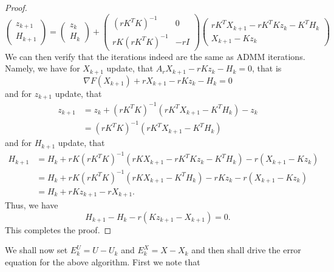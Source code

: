 \begin{itemize}
\begin{proof}
\begin{equation}
    \begin{pmatrix}
    z_{k+1}\\
    H_{k+1}
    \end{pmatrix} = \begin{pmatrix}
    z_{k}\\H_{k}
    \end{pmatrix} + \begin{pmatrix}
    (r K^T K)^{-1} & 0 \\
   r K (r K^T K)^{-1} & -r I
    \end{pmatrix} \begin{pmatrix}
     r K^T X_{k+1} - r K^T K z_k - K^T H_k\\
     X_{k+1} - Kz_k
    \end{pmatrix}
\end{equation}
We can then verify that the iterations indeed are the same as ADMM iterations. Namely, we have for $X_{k+1}$ update, that $A_r X_{k+1} - r Kz_{k} - H_k = 0 $, that is 
\begin{equation}
\nabla F(X_{k+1}) + r X_{k+1} - r K z_k - H_k = 0
\end{equation}
and for $z_{k+1}$ update, that \begin{equation}
\begin{aligned}
z_{k+1} &= z_k + (r K^T K)^{-1} (r K^T X_{k+1} - K^T H_k) - z_k \\
& = (r K^T K)^{-1} (r K^T X_{k+1} - K^T H_k)
\end{aligned}
\end{equation}
and for $H_{k+1}$ update, that  \begin{equation}
\begin{aligned}
H_{k+1} & = H_k +  r K(r K^T K )^{-1}\left( r K X_{k+1} - r K^T K z_k - K^T H_k \right) -r (X_{k+1} - Kz_k) \\
                & = H_k + r K(r K^T K )^{-1} (r K X_{k+1} - K^T H_k) - r K z_k - r (X_{k+1} - Kz_k) \\
                & = H_k +r K z_{k+1} -r X_{k+1}.
\end{aligned}
\end{equation}
Thus, we have 
\begin{equation}
H_{k+1} - H_k -r(Kz_{k+1} - X_{k+1})=0.
\end{equation}
This completes the proof. 
\end{proof}
We shall now set $E_k^U = U - U_k$ and $E_k^X = X - X_k$ and then shall drive the error equation for the above algorithm. First we note that 

\end{itemize}
